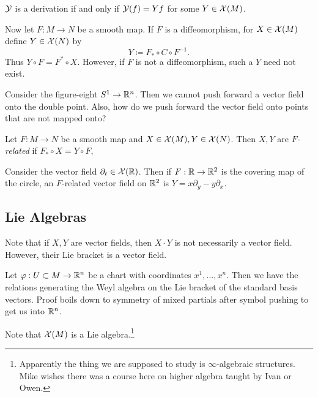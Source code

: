 \documentclass[twoside, 10pt]{article}
\begin{document}
    \begin{prop}
        $\mathcal{Y}$ is a derivation if and only if $\mathcal{Y}(f) = Yf$ for some $Y \in \mathcal{X}(M)$.
    \end{prop}

    Now let $F:M \to N$ be a smooth map. If $F$ is a diffeomorphism, for $X \in \mathcal{X}(M)$ define $Y \in \mathcal{X}(N)$ by \[Y \coloneqq F_* \circ C \circ F^{-1}.\] Thus $Y \circ F = F^* \circ X$. However, if $F$ is not a diffeomorphism, such a $Y$ need not exist.

    \begin{exm}
        Consider the figure-eight $S^1 \to \mathbb{R}^n$. Then we cannot push forward a vector field onto the double point. Also, how do we push forward the vector field onto points that are not mapped onto?
    \end{exm}
    
    \begin{defn}
        Let $F:M \to N$ be a smooth map and $X \in \mathcal{X}(M), Y \in \mathcal{X}(N)$. Then $X,Y$ are \textit{$F$-related} if $F_* \circ X = Y \circ F$,
    \end{defn}

    \begin{exm}
        Consider the vector field $\partial_t \in \mathcal{X}(\mathbb{R})$. Then if $F:\mathbb{R} \to \mathbb{R}^2$ is the covering map of the circle, an $F$-related vector field on $\mathbb{R}^2$ is $Y = x \partial_y - y \partial_x$.
    \end{exm}

    \subsection{Lie Algebras}%
    \label{sub:lie_algebras}
    
    

    Note that if $X,Y$ are vector fields, then $X \cdot Y$ is not necessarily a vector field. However, their Lie bracket is a vector field.

    \begin{exm}
        Let $\varphi:U \subset M \to \mathbb{R}^n$ be a chart with coordinates $x^1, \ldots, x^n$. Then we have the relations generating the Weyl algebra on the Lie bracket of the standard basis vectors. Proof boils down to symmetry of mixed partials after symbol pushing to get us into $\mathbb{R}^n$.
    \end{exm}

    Note that $\mathcal{X}(M)$ is a Lie algebra.\footnote{Apparently the thing we are supposed to study is $\infty$-algebraic structures. Mike wishes there was a course here on higher algebra taught by Ivan or Owen.}
\end{document}
